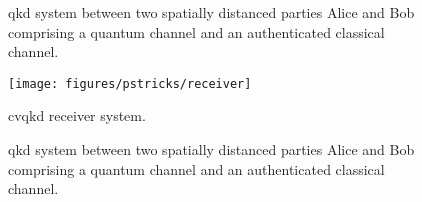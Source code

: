 \begin{figure}[htb]
	\centering
	
	\caption{\Gls{qkd} system between two spatially distanced parties Alice and Bob comprising a quantum channel and an authenticated classical channel.}
\end{figure}

\begin{figure}[htb]
	\centering
	\texttt{[image: figures/pstricks/receiver]}
	\caption{\Gls{cvqkd} receiver system.}
\end{figure}

\begin{figure}[htb]
	\centering
	
	\caption{\Gls{qkd} system between two spatially distanced parties Alice and Bob comprising a quantum channel and an authenticated classical channel.}
\end{figure}